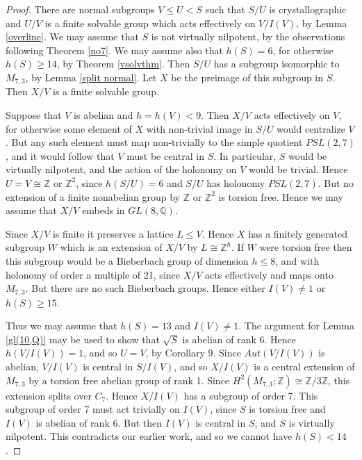 \documentclass[10pt,a4paper]{amsart}
\renewcommand{\geq}{\geqslant}
\renewcommand{\leq}{\leqslant}
\begin{document}
\begin{proof}
There are normal subgroups $V\leq{U}<S$ such that $S/U$ is crystallographic
and $U/V$ is a finite solvable group which acts effectively on $V/I(V)$,
by Lemma \ref{overline}.
We may assume that $S$ is not virtually nilpotent,
by the observations following Theorem \ref{no7}.
We may assume also that $h(S)=6$, for otherwise $h(S)\geq14$,
by Theorem \ref{vsolvthm}.
Then $S/U$ has  a subgroup isomorphic to $M_{7,3}$, 
by Lemma \ref{split normal}.
Let $X$ be the preimage of this subgroup in $S$.
Then $X/V$ is a finite solvable group.

Suppose that $V$ is abelian and $h=h(V)<9$.
Then $X/V$ acts effectively on $V$,
for otherwise some element of $X$ with non-trivial image in $S/U$ would centralize $V$.
But any such element must map non-trivially to the simple quotient $PSL(2,7)$,
and it would follow that $V$ must be central in $S$.
In particular, $S$ would be virtually nilpotent, 
and the action of the holonomy on $V$ would be trivial.
Hence $U=V\cong\mathbb{Z}$ or $\mathbb{Z}^2$, 
since $h(S/U)=6$ and $S/U$ has holonomy $PSL(2,7)$.
But no extension of a finite nonabelian group by $\mathbb{Z}$ or $\mathbb{Z}^2$
is torsion free.
Hence we may assume that $X/V$ embeds in $GL(8,\mathbb{Q})$.

Since $X/V$ is finite it preserves a lattice $L\leq{V}$.
Hence $X$ has a finitely generated subgroup $W$ which is an extension of $X/V$
by $L\cong\mathbb{Z}^h$.
If $W$ were torsion free then this subgroup would be a Bieberbach group 
of dimension $h\leq8$, and with holonomy of order a multiple of 21,
since $X/V$ acts effectively and maps onto $M_{7,3}$.
But there are no such Bieberbach groups. 
Hence either $I(V)\not=1$ or $h(S)\geq15$.

Thus we may assume that $h(S)=13$ and $I(V)\not=1$.
The argument for Lemma \ref{gl(10,Q)} may be used to show 
that $\sqrt{S}$ is abelian of rank 6.
Hence $h(V/I(V))=1$, and so $U=V$, by Corollary 9.
Since $Aut(V/I(V))$ is abelian, $V/I(V)$ is central in $S/I(V)$,
and so $X/I(V)$ is a central extension of $M_{7,3}$ 
by a torsion free abelian group of rank 1.
Since $H^2(M_{7,3};\mathbb{Z})\cong\mathbb{Z}/3\mathbb{Z}$, 
this extension splits over $C_7$.
Hence $X/I(V)$ has a subgroup of order 7.
This subgroup of order 7 must act trivially on $I(V)$,
since $S$ is torsion free and $I(V)$ is abelian of rank 6.
But then $I(V)$ is central in $S$, and $S$ is virtually nilpotent.
This contradicts our earlier work, and so we cannot have $h(S)<14$.
\end{proof}
\end{document}
